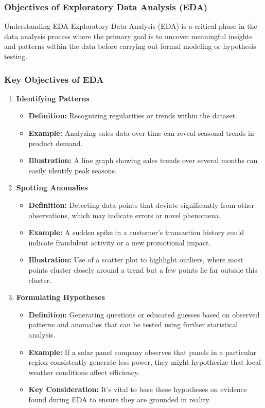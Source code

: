 \documentclass[aspectratio=169]{beamer}
\begin{document}
\begin{frame}[fragile]
    \frametitle{Objectives of Exploratory Data Analysis (EDA)}
    \begin{block}{Understanding EDA}
        Exploratory Data Analysis (EDA) is a critical phase in the data analysis process where the primary goal is to uncover meaningful insights and patterns within the data before carrying out formal modeling or hypothesis testing.
    \end{block}
\end{frame}

\begin{frame}[fragile]
    \frametitle{Key Objectives of EDA}
    \begin{enumerate}
        \item \textbf{Identifying Patterns}
            \begin{itemize}
                \item \textbf{Definition:} Recognizing regularities or trends within the dataset.
                \item \textbf{Example:} Analyzing sales data over time can reveal seasonal trends in product demand.
                \item \textbf{Illustration:} A line graph showing sales trends over several months can easily identify peak seasons.
            \end{itemize}

        \item \textbf{Spotting Anomalies}
            \begin{itemize}
                \item \textbf{Definition:} Detecting data points that deviate significantly from other observations, which may indicate errors or novel phenomena.
                \item \textbf{Example:} A sudden spike in a customer's transaction history could indicate fraudulent activity or a new promotional impact.
                \item \textbf{Illustration:} Use of a scatter plot to highlight outliers, where most points cluster closely around a trend but a few points lie far outside this cluster.
            \end{itemize}

        \item \textbf{Formulating Hypotheses}
            \begin{itemize}
                \item \textbf{Definition:} Generating questions or educated guesses based on observed patterns and anomalies that can be tested using further statistical analysis.
                \item \textbf{Example:} If a solar panel company observes that panels in a particular region consistently generate less power, they might hypothesize that local weather conditions affect efficiency.
                \item \textbf{Key Consideration:} It’s vital to base these hypotheses on evidence found during EDA to ensure they are grounded in reality.
            \end{itemize}
    \end{enumerate}
\end{frame}
\end{document}
